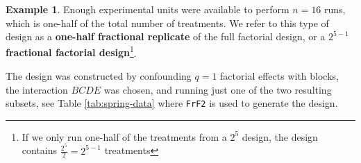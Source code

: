\documentclass[
]{book}
\newenvironment{Shaded}{\begin{snugshade}}{\end{snugshade}}
\newcommand{\AttributeTok}[1]{\textcolor[rgb]{0.77,0.63,0.00}{#1}}
\newcommand{\DecValTok}[1]{\textcolor[rgb]{0.00,0.00,0.81}{#1}}
\newcommand{\FloatTok}[1]{\textcolor[rgb]{0.00,0.00,0.81}{#1}}
\newcommand{\FunctionTok}[1]{\textcolor[rgb]{0.00,0.00,0.00}{#1}}
\newcommand{\NormalTok}[1]{#1}
\newcommand{\OtherTok}[1]{\textcolor[rgb]{0.56,0.35,0.01}{#1}}
\newcommand{\SpecialCharTok}[1]{\textcolor[rgb]{0.00,0.00,0.00}{#1}}
\newcommand{\StringTok}[1]{\textcolor[rgb]{0.31,0.60,0.02}{#1}}
\theoremstyle{definition}
\theoremstyle{definition}
\newtheorem{example}{Example}[chapter]
\theoremstyle{definition}
\theoremstyle{definition}
\theoremstyle{remark}
\begin{document}
\begin{example}
Enough experimental units were available to perform \(n=16\) runs, which is one-half of the total number of treatments. We refer to this type of design as a \textbf{one-half fractional replicate} of the full factorial design, or a \textbf{\(2^{5-1}\) fractional factorial design}\footnote{If we only run one-half of the treatments from a \(2^5\) design, the design contains \(\frac{2^5}{2} = 2^{5-1}\) treatments}.

The design was constructed by confounding \(q=1\) factorial effects with blocks, the interaction \(BCDE\) was chosen, and running just one of the two resulting subsets, see Table \ref{tab:spring-data} where \texttt{FrF2} is used to generate the design.

\begin{Shaded}
\end{Shaded}

\begin{table}


\end{table}
\end{example}
\end{document}
